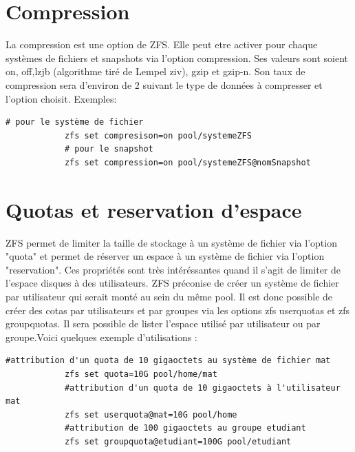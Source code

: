 \documentclass[a4paper]{report}
\begin{document}
	\section{Compression}
		La compression est une option de ZFS. Elle peut etre activer pour chaque systèmes de fichiers et snapshots via l'option compression. Ses valeurs sont soient on, off,lzjb (algorithme tiré de Lempel ziv), gzip et gzip-n. Son taux de compression sera d'environ de 2 suivant le type de données à compresser et l'option choisit. Exemples:
		\begin{lstlisting}[language=ksh,texcl]
			# pour le système de fichier
			zfs set compresison=on pool/systemeZFS 
			# pour le snapshot
			zfs set compression=on pool/systemeZFS@nomSnapshot 
		\end{lstlisting}
	\section{Quotas et reservation d'espace}
		ZFS permet de limiter la taille de stockage à un système de fichier via l'option "quota" et permet de réserver un espace à un système de fichier via l'option "reservation". Ces propriétés sont très intéréssantes quand il s'agit de limiter de l'espace disques à des utilisateurs. ZFS préconise de créer un système de fichier par utilisateur qui serait monté au sein du même pool. Il est donc possible de créer des cotas par utilisateurs et par groupes via les options zfs userquotas et zfs groupquotas. Il sera possible de lister l'espace utilisé par utilisateur ou par groupe.Voici quelques exemple d'utilisations :
		\begin{lstlisting}[language=ksh,texcl]
			#attribution d'un quota de 10 gigaoctets au système de fichier mat
			zfs set quota=10G pool/home/mat 
			#attribution d'un quota de 10 gigaoctets à l'utilisateur mat
			zfs set userquota@mat=10G pool/home 
			#attribution de 100 gigaoctets au groupe etudiant
			zfs set groupquota@etudiant=100G pool/etudiant 
		\end{lstlisting}
\end{document}
